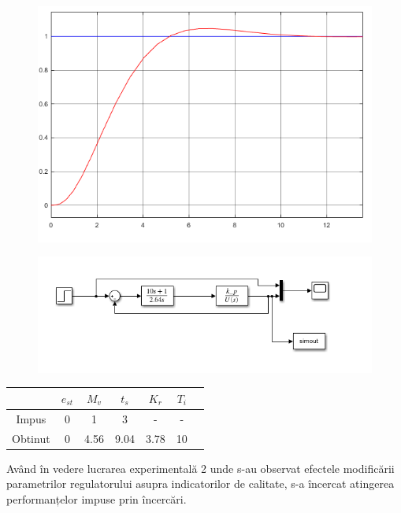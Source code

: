 \documentclass[11pt]{article}
\begin{document}
\begin{figure}[H]
	\centering
	\begin{minipage}{.4\textwidth}
		\centering
		\includegraphics[width=.9\linewidth]{CMVK.png}
		\label{fig:test1}
	\end{minipage}%
	\begin{minipage}{.6\textwidth}
		\centering
		\includegraphics[width=.9\linewidth]{sim_cmvk.png}
		\label{fig:test2}
	\end{minipage}
\end{figure}
\begin{center}
	\begin{tabular}{|c|c|c|c|c|c|c|}
		\hline
		&$e_{st}$&$M_v$&$t_s$&$K_r$&$T_i$\\
		\hline
		Impus&0&1&3&-&-\\
		\hline
		Obtinut&0&4.56&9.04&3.78&10\\
		\hline
	\end{tabular}
\end{center}
Având în vedere lucrarea experimentală 2 unde s-au observat efectele modificării parametrilor regulatorului asupra indicatorilor de calitate, s-a încercat atingerea performanțelor impuse prin încercări.
\end{document}
